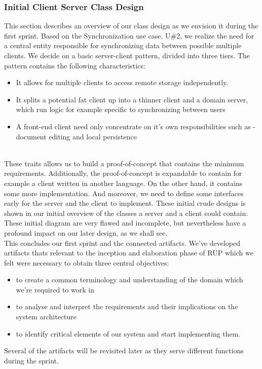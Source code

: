 \subsubsection{Initial Client Server Class Design}
This section describes an overview of our class design as we envision it during the first sprint. Based on the Synchronization use case, U\#2, we realize the need for a central entity responsible for synchronizing data between possible multiple clients. We decide on a basic server-client pattern, divided into three tiers. The pattern contains the following characteristics:\\
\begin{itemize}
\item It allows for multiple clients to access remote storage independently.
\item It splits a potential fat client up into a thinner client and a domain server, which run logic for example specific to synchronizing between users
\item A front-end client need only concentrate on it’s own responsibilities such as - document editing and local persistence
\end{itemize}
\cite{ttda}\\
These traits allows us to build a proof-of-concept that contains the minimum requirements. Additionally, the proof-of-concept is expandable to contain for example a client written in another language. On the other hand, it contains some more implementation. And moreover, we need to define some interfaces early for the server and the client to implement. These initial crude designs is shown in our initial overview of the classes a server and a client could contain:\\
These initial diagram are very flawed and incomplete, but nevertheless have a profound impact on our later design, as we shall see.\\
\newline
This concludes our first sprint and the connected artifacts. We’ve developed artifacts thats relevant to the inception and elaboration phase of RUP which we felt were necessary to obtain three central objectives:\\
\begin{itemize}
\item to create a common terminology and understanding of the domain which we’re required to work in
\item to analyse and interpret the requirements and their implications on the system architecture
\item to identify critical elements of our system and start implementing them.
\end{itemize}
Several of the artifacts will be revisited later as they serve different functions during the sprint.\\